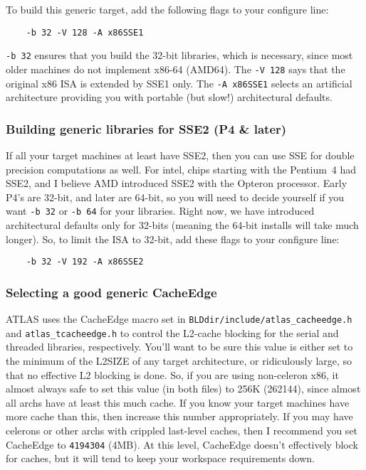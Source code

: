 \documentclass[11pt]{article}
\begin{document}
To build this generic target, add the following flags to your configure line:
\begin{verbatim}
    -b 32 -V 128 -A x86SSE1
\end{verbatim}

\verb+-b 32+ ensures that you build the 32-bit libraries, which is necessary,
since most older machines do not implement x86-64 (AMD64).  The 
\verb+-V 128+ says that the original x86 ISA is extended by SSE1 only.
The \verb+-A x86SSE1+ selects an artificial architecture
providing you with portable (but slow!) architectural defaults.

\subsubsection{Building generic libraries for SSE2 (P4 \& later)}
If all your target machines at least have SSE2, then you can use SSE for
double precision computations as well.  For intel, chips starting with
the Pentium~4 had SSE2, and I believe AMD introduced SSE2 with the Opteron
processor.  Early P4's are 32-bit, and later are 64-bit, so you will need
to decide yourself if you want \verb+-b 32+ or \verb+-b 64+ for your 
libraries.  Right now, we have introduced architectural defaults only
for 32-bits (meaning the 64-bit installs will take much longer).  So, to
limit the ISA to 32-bit, add these flags to your configure line:
\begin{verbatim}
    -b 32 -V 192 -A x86SSE2
\end{verbatim}

\subsubsection{Selecting a good generic CacheEdge}
ATLAS uses the CacheEdge macro set in 
\verb+BLDdir/include/atlas_cacheedge.h+ and \verb+atlas_tcacheedge.h+ to
control the L2-cache blocking  for the serial and threaded libraries,
respectively.  You'll want to be sure this value is either set to
the minimum of the L2SIZE of any target architecture, or ridiculously large,
so that no effective L2 blocking is done.  So, if you are using non-celeron
x86, it almost always safe to set this value (in both files) to 256K
(262144), since almost all archs have at least this much cache.  If you
know your target machines have more cache than this, then increase this
number appropriately.  If you may have celerons or other archs with
crippled last-level caches, then I recommend you set CacheEdge to
\verb+4194304+ (4MB).  At this level, CacheEdge doesn't effectively
block for caches, but it will tend to keep your workspace requirements
down.
\end{document}
